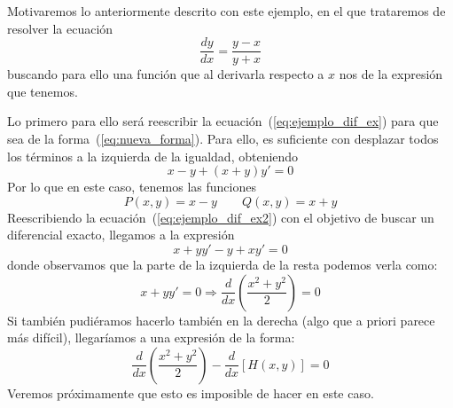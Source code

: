 \begin{ejemplo}
    Motivaremos lo anteriormente descrito con este ejemplo, en el que trataremos de resolver la ecuación
    \begin{equation}\label{eq:ejemplo_dif_ex}
        \dfrac{dy}{dx} = \dfrac{y-x}{y+x}
    \end{equation}
    buscando para ello una función que al derivarla respecto a $x$ nos de la expresión que tenemos.

    Lo primero para ello será reescribir la ecuación~(\ref{eq:ejemplo_dif_ex}) para que sea de la forma~(\ref{eq:nueva_forma}). Para ello, es suficiente con desplazar todos los términos a la izquierda de la igualdad, obteniendo
    \begin{equation}\label{eq:ejemplo_dif_ex2}
        x-y+(x+y)y' = 0
    \end{equation}
    Por lo que en este caso, tenemos las funciones
    \begin{equation*}
        P(x,y) = x-y \qquad Q(x,y) = x+y
    \end{equation*}
    Reescribiendo la ecuación~(\ref{eq:ejemplo_dif_ex2}) con el objetivo de buscar un diferencial exacto, llegamos a la expresión
    \begin{equation*}
        x+yy' - y+xy' = 0
    \end{equation*}
    donde observamos que la parte de la izquierda de la resta podemos verla como:
    \begin{equation*}
        x+yy' = 0 \Longrightarrow \dfrac{d}{dx}\left(\dfrac{x^2+y^2}{2}\right) = 0
    \end{equation*}
    Si también pudiéramos hacerlo también en la derecha (algo que a priori parece más difícil), llegaríamos a una expresión de la forma:
    \begin{equation*}
        \dfrac{d}{dx}\left(\dfrac{x^2+y^2}{2}\right) - \dfrac{d}{dx}[H(x,y)] = 0
    \end{equation*}
    Veremos próximamente que esto es imposible de hacer en este caso.


\end{ejemplo}
